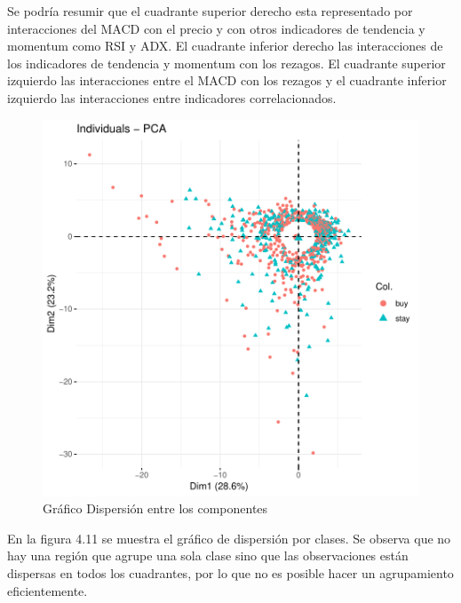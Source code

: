 \documentclass[a4paper,12pt]{Latex/Classes/PhDthesisPSnPDF}
\begin{document}
Se podría resumir que el cuadrante superior derecho esta representado por interacciones del MACD con el precio y con otros indicadores de tendencia y momentum como RSI y ADX. El cuadrante inferior derecho las interacciones de los indicadores de tendencia y momentum con los rezagos. El cuadrante superior izquierdo las interacciones entre el MACD con los rezagos y el cuadrante inferior izquierdo las interacciones entre indicadores correlacionados.


\begin{figure}[H]
\centering
\includegraphics{main-018}
\caption{Gráfico Dispersión entre los componentes}
\end{figure}

En la figura 4.11 se muestra el gráfico de dispersión por clases. Se observa que no hay una región que agrupe una sola clase sino que las observaciones están dispersas en todos los cuadrantes, por lo que no es posible hacer un agrupamiento eficientemente.

\end{document}
